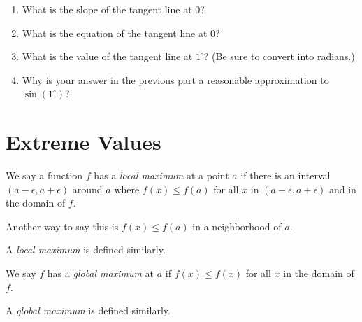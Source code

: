 \documentclass[11pt]{book}
\numberwithin{example}{chapter}
\begin{document}
\begin{enumerate}
\begin{enumerate}
\item What is the slope of the tangent line at $0$?



\item What is the equation of the tangent line at $0$?



\item What is the value of the tangent line at $1^\circ$?  (Be sure to convert into radians.)



\item Why is your answer in the previous part a reasonable approximation to $\sin(1^\circ)$?

\end{enumerate}


\end{enumerate}



\section{Extreme Values}


We say a function $f$ has a \emph{local maximum} at a point $a$ if there is an interval $(a-\epsilon,a+\epsilon)$ around $a$ where $f(x)\leq f(a)$ for all $x$ in $(a-\epsilon,a+\epsilon)$ and in the domain of $f$. 

Another way to say this is $f(x)\leq f(a)$ in a neighborhood of $a$.  

A \emph{local maximum} is defined similarly.  


We say $f$ has a \emph{global maximum} at $a$ if $f(x)\leq f(x)$ for all $x$ in the domain of $f$.  

A \emph{global maximum} is defined similarly.  
\end{document}
